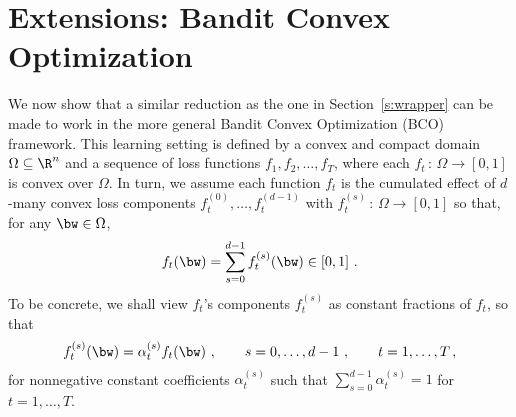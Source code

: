 
\newcommand{\fcomp}{f^{\circ}}
\newcommand{\scD}{\mathcal{D}}
\newcommand{\bb}{\boldsymbol{b}}
\newcommand{\B}{\field{B}}

\section{Extensions: Bandit Convex Optimization}\label{s:bco}
%
We now show that a similar reduction as the one in Section~\ref{s:wrapper} can be made to work in the more general Bandit Convex Optimization (BCO) framework. This learning setting is defined by a convex and compact domain $\Omega \subseteq \R^n$ and a sequence of loss functions $f_1, f_2, \ldots, f_T$, where each $f_t\,:\,\Omega \to [0,1]$ is convex over $\Omega$. In turn, we assume each function $f_t$ is the cumulated effect of $d$-many convex loss components $f_t^{(0)},\ldots, f_t^{(d-1)}$ with $f_t^{(s)}\,:\,\Omega \to [0,1]$ so that, for any $\bw \in \Omega$, 
%
\[
f_t(\bw) = \sum_{s=0}^{d-1} f_t^{(s)}(\bw) \in [0,1]~.
\]
To be concrete, we shall view $f_t$'s components $f_t^{(s)}$ as constant fractions of $f_t$, so that
\[
f_t^{(s)}(\bw) = \alpha^{(s)}_{t} f_t(\bw)~, \qquad s = 0,\ldots, d-1~, \qquad t = 1,\ldots, T\,,
\]
for nonnegative constant coefficients $\alpha^{(s)}_{t}$ such that $\sum_{s=0}^{d-1}\alpha^{(s)}_{t} =1$ for $t = 1, \ldots, T$.


